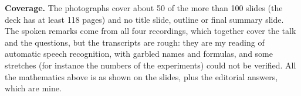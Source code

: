 \medskip\noindent
{\bf Coverage.}
The photographs cover about 50 of the more
than 100 slides (the deck has at least 118
pages) and no title slide, outline or final
summary slide. The spoken remarks come from
all four recordings, which together cover the
talk and the questions, but the transcripts are
rough: they are my reading of automatic speech
recognition, with garbled names and
formulas, and some stretches (for instance the
numbers of the experiments) could not be
verified. All the mathematics above is as
shown on the slides, plus the editorial
answers, which are mine.





